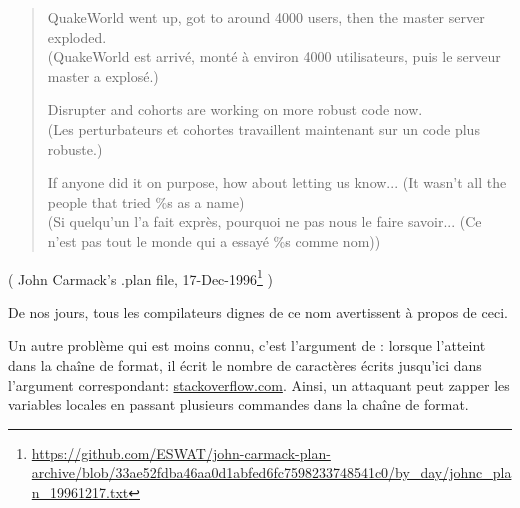 \begin{framed}
\begin{quotation}
QuakeWorld went up, got to around 4000 users, then the master server exploded.\\
(QuakeWorld est arrivé, monté à environ 4000 utilisateurs, puis le serveur master a explosé.)

Disrupter and cohorts are working on more robust code now.\\
(Les perturbateurs et cohortes travaillent maintenant sur un code plus robuste.)

If anyone did it on purpose, how about letting us know... (It wasn't all the people that tried \%s as a name)\\
(Si quelqu'un l'a fait exprès, pourquoi ne pas nous le faire savoir... (Ce n'est pas tout le monde qui a essayé \%s comme nom))
\end{quotation}
\end{framed}
( John Carmack's .plan file, 17-Dec-1996\footnote{\url{https://github.com/ESWAT/john-carmack-plan-archive/blob/33ae52fdba46aa0d1abfed6fc7598233748541c0/by_day/johnc_plan_19961217.txt}} )

De nos jours, tous les compilateurs dignes de ce nom avertissent à propos de ceci.

Un autre problème qui est moins connu, c'est l'argument  de \printf: lorsque
\printf l'atteint dans la chaîne de format, il écrit le nombre de caractères écrits
jusqu'ici dans l'argument correspondant:
\href{http://stackoverflow.com/questions/3401156/what-is-the-use-of-the-n-format-specifier-in-c}{stackoverflow.com}.
Ainsi, un attaquant peut zapper les variables locales en passant plusieurs commandes
 dans la chaîne de format.
